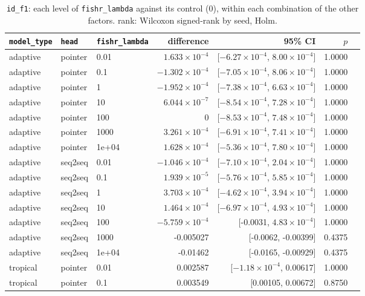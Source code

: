 \documentclass[10pt]{article}
\begin{document}
{\small
\begin{longtable}{lllrrrl}
\caption{\texttt{id\_f1}: each level of \texttt{fishr\_lambda} against its control (0), within each combination of the other factors. rank: Wilcoxon signed-rank by seed, Holm.}\label{tab:control-id_f1}\\
\toprule
\texttt{model\_type} & \texttt{head} & \texttt{fishr\_lambda} & difference & 95\% CI & $p$ & \\
\midrule
\endhead
adaptive & pointer & 0.01 & $1.633\times10^{-4}$ & [$-6.27\times10^{-4}$, $8.00\times10^{-4}$] & 1.0000 & \\
adaptive & pointer & 0.1 & $-1.302\times10^{-4}$ & [$-7.05\times10^{-4}$, $8.06\times10^{-4}$] & 1.0000 & \\
adaptive & pointer & 1 & $-1.952\times10^{-4}$ & [$-7.38\times10^{-4}$, $6.63\times10^{-4}$] & 1.0000 & \\
adaptive & pointer & 10 & $6.044\times10^{-7}$ & [$-8.54\times10^{-4}$, $7.28\times10^{-4}$] & 1.0000 & \\
adaptive & pointer & 100 & 0 & [$-8.53\times10^{-4}$, $7.48\times10^{-4}$] & 1.0000 & \\
adaptive & pointer & 1000 & $3.261\times10^{-4}$ & [$-6.91\times10^{-4}$, $7.41\times10^{-4}$] & 1.0000 & \\
adaptive & pointer & 1e+04 & $1.628\times10^{-4}$ & [$-5.36\times10^{-4}$, $7.80\times10^{-4}$] & 1.0000 & \\
adaptive & seq2seq & 0.01 & $-1.046\times10^{-4}$ & [$-7.10\times10^{-4}$, $2.04\times10^{-4}$] & 1.0000 & \\
adaptive & seq2seq & 0.1 & $1.939\times10^{-5}$ & [$-5.76\times10^{-4}$, $5.85\times10^{-4}$] & 1.0000 & \\
adaptive & seq2seq & 1 & $3.703\times10^{-4}$ & [$-4.62\times10^{-4}$, $3.94\times10^{-4}$] & 1.0000 & \\
adaptive & seq2seq & 10 & $1.464\times10^{-4}$ & [$-6.97\times10^{-4}$, $4.93\times10^{-4}$] & 1.0000 & \\
adaptive & seq2seq & 100 & $-5.759\times10^{-4}$ & [-0.0031, $4.83\times10^{-4}$] & 1.0000 & \\
adaptive & seq2seq & 1000 & -0.005027 & [-0.0062, -0.00399] & 0.4375 & \\
adaptive & seq2seq & 1e+04 & -0.01462 & [-0.0165, -0.00929] & 0.4375 & \\
tropical & pointer & 0.01 & 0.002587 & [$-1.18\times10^{-4}$, 0.00617] & 1.0000 & \\
tropical & pointer & 0.1 & 0.003549 & [0.00105, 0.00672] & 0.8750 & \\

\end{longtable}}
\end{document}
